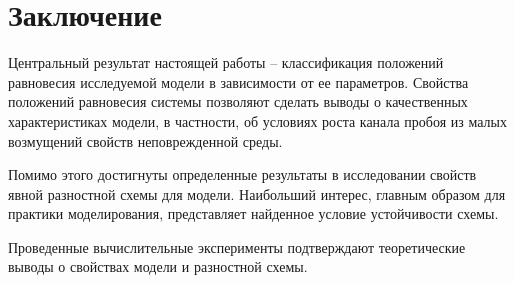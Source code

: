 
\section{Заключение}

Центральный результат настоящей работы -- классификация положений равновесия исследуемой модели в зависимости от ее параметров. Свойства положений равновесия системы позволяют сделать выводы о качественных характеристиках модели, в частности, об условиях роста канала пробоя из малых возмущений свойств неповрежденной среды.

Помимо этого достигнуты определенные результаты в исследовании свойств явной разностной схемы для модели. Наибольший интерес, главным образом для практики моделирования, представляет найденное условие устойчивости схемы.

Проведенные вычислительные эксперименты подтверждают теоретические выводы о свойствах модели и разностной схемы.